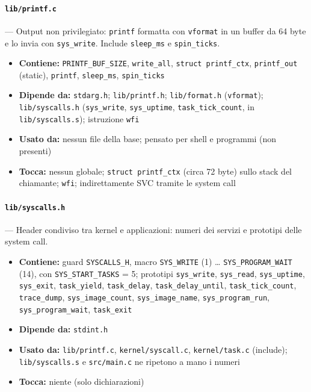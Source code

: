 \paragraph{\texttt{lib/printf.c}} --- Output non privilegiato: \texttt{printf} formatta con \texttt{vformat} in un buffer da 64 byte e lo invia con \texttt{sys\_write}. Include \texttt{sleep\_ms} e \texttt{spin\_ticks}.
\begin{itemize}
  \item \textbf{Contiene:} \texttt{PRINTF\_BUF\_SIZE}, \texttt{write\_all}, \texttt{struct printf\_ctx}, \texttt{printf\_out} (static), \texttt{printf}, \texttt{sleep\_ms}, \texttt{spin\_ticks}
  \item \textbf{Dipende da:} \texttt{stdarg.h}; \texttt{lib/printf.h}; \texttt{lib/format.h} (\texttt{vformat}); \texttt{lib/syscalls.h} (\texttt{sys\_write}, \texttt{sys\_uptime}, \texttt{task\_tick\_count}, in \texttt{lib/syscalls.s}); istruzione \texttt{wfi}
  \item \textbf{Usato da:} nessun file della base; pensato per shell e programmi (non presenti)
  \item \textbf{Tocca:} nessun globale; \texttt{struct printf\_ctx} (circa 72 byte) sullo stack del chiamante; \texttt{wfi}; indirettamente SVC tramite le system call
\end{itemize}

\paragraph{\texttt{lib/syscalls.h}} --- Header condiviso tra kernel e applicazioni: numeri dei servizi e prototipi delle system call.
\begin{itemize}
  \item \textbf{Contiene:} guard \texttt{SYSCALLS\_H}, macro \texttt{SYS\_WRITE} (1) \ldots{} \texttt{SYS\_PROGRAM\_WAIT} (14), con \texttt{SYS\_START\_TASKS} = 5; prototipi \texttt{sys\_write}, \texttt{sys\_read}, \texttt{sys\_uptime}, \texttt{sys\_exit}, \texttt{task\_yield}, \texttt{task\_delay}, \texttt{task\_delay\_until}, \texttt{task\_tick\_count}, \texttt{trace\_dump}, \texttt{sys\_image\_count}, \texttt{sys\_image\_name}, \texttt{sys\_program\_run}, \texttt{sys\_program\_wait}, \texttt{task\_exit}
  \item \textbf{Dipende da:} \texttt{stdint.h}
  \item \textbf{Usato da:} \texttt{lib/printf.c}, \texttt{kernel/syscall.c}, \texttt{kernel/task.c} (include); \texttt{lib/syscalls.s} e \texttt{src/main.c} ne ripetono a mano i numeri
  \item \textbf{Tocca:} niente (solo dichiarazioni)
\end{itemize}


